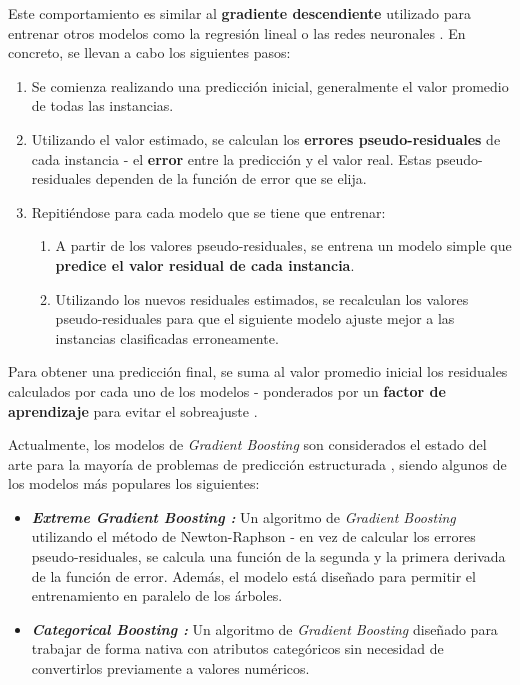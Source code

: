 \begin{itemize}
	Este comportamiento es similar al \textbf{gradiente descendiente} utilizado para entrenar otros modelos como la regresión lineal o las redes neuronales \cite{Burkov2019TheHM}. En concreto, se llevan a cabo los siguientes pasos:
	\begin{enumerate}
		\item Se comienza realizando una predicción inicial, generalmente el valor promedio de todas las instancias.
		\item Utilizando el valor estimado, se calculan los \textbf{errores pseudo-residuales} de cada instancia - el \textbf{error} entre la predicción y el valor real. Estas pseudo-residuales dependen de la función de error que se elija.
		\item Repitiéndose para cada modelo que se tiene que entrenar:
		\begin{enumerate}
			\item A partir de los valores pseudo-residuales, se entrena un modelo simple que \textbf{predice el valor residual de cada instancia}.
			\item Utilizando los nuevos residuales estimados, se recalculan los valores pseudo-residuales para que el siguiente modelo ajuste mejor a las instancias clasificadas erroneamente.
		\end{enumerate}
	\end{enumerate}
	
	Para obtener una predicción final, se suma al valor promedio inicial los residuales calculados por cada uno de los modelos - ponderados por un \textbf{factor de aprendizaje} para evitar el sobreajuste \cite{gradientboosting}.
	
	Actualmente, los modelos de \textit{Gradient Boosting} son considerados el estado del arte para la mayoría de problemas de predicción estructurada \cite{Burkov2019TheHM}, siendo algunos de los modelos más populares los siguientes:
	
	\begin{itemize}
		\item \textbf{\textit{Extreme Gradient Boosting \cite{Chen_2016}:}} Un algoritmo de \textit{Gradient Boosting} utilizando el método de Newton-Raphson - en vez de calcular los errores pseudo-residuales, se calcula una función de la segunda y la primera derivada de la función de error. Además, el modelo está diseñado para permitir el entrenamiento en paralelo de los árboles.
		\item \textbf{\textit{Categorical Boosting \cite{dorogush2018catboostgradientboostingcategorical}:}} Un algoritmo de \textit{Gradient Boosting} diseñado para trabajar de forma nativa con atributos categóricos sin necesidad de convertirlos previamente a valores numéricos. 
		

\end{itemize}
\end{itemize}
